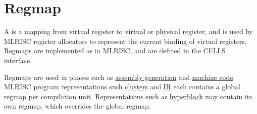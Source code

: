 \section{Regmap}
A 
is a mapping from virtual register to virtual or physical
register, and is used by MLRISC register allocators to
represent the current binding of virtual registers.  Regmaps are implemented
as  
in MLRISC, and are defined in the
\href{cells.html}{CELLS} interface.

Regmaps are used in phases such as 
\href{asm.html}{assembly generation} and 
\href{mc.html}{machine code}.   MLRISC program representations such
\href{cluster.html}{clusters} and \href{mlrisc-ir.html}{IR}
each contains a global regmap per compilation unit.  Representations
such as \href{hyperblock.html}{hyperblock} may contain its own
regmap, which overrides the global regmap. 
